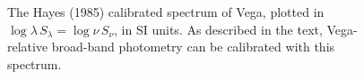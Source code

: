 \begin{figure}
\caption[The Hayes (1985) calibrated spectrum of Vega.]{
The Hayes (1985) calibrated spectrum of Vega, plotted in
$\log\lambda\,S_{\lambda}=\log\nu\,S_{\nu}$, in SI units.  As
described in the text, Vega-relative broad-band photometry can be
calibrated with this spectrum.}
\label{fig:hayes}
\end{figure}


